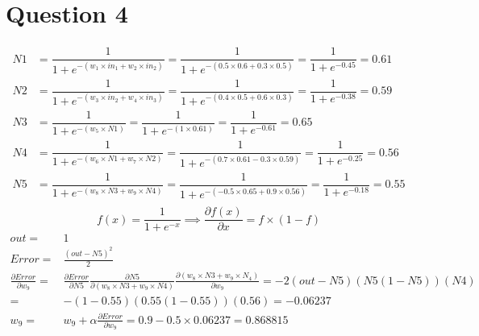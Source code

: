 \documentclass[letter, 10pt]{article}
\begin{document}
\section*{Question 4}
\begin{align*}
    N1 &= \dfrac{1}{1 + e^{-(w_1\times in_1 + w_2\times in_2)}} = \dfrac{1}{1 + e^{-(0.5\times 0.6 + 0.3\times 0.5)}} = \dfrac{1}{1 + e^{-0.45}} = 0.61\\
    N2 &= \dfrac{1}{1 + e^{-(w_3\times in_2 + w_4\times in_3)}} = \dfrac{1}{1 + e^{-(0.4\times 0.5 + 0.6\times 0.3)}} = \dfrac{1}{1 + e^{-0.38}} = 0.59\\
    N3 &= \dfrac{1}{1 + e^{-(w_5\times N1)}} = \dfrac{1}{1 + e^{-(1\times 0.61)}} = \dfrac{1}{1 + e^{-0.61}} = 0.65\\
    N4 &= \dfrac{1}{1 + e^{-(w_6\times N1 + w_7\times N2)}} = \dfrac{1}{1 + e^{-(0.7\times 0.61 - 0.3\times 0.59)}} = \dfrac{1}{1 + e^{-0.25}} = 0.56\\
    N5 &= \dfrac{1}{1 + e^{-(w_8\times N3 + w_9\times N4)}} = \dfrac{1}{1 + e^{-(-0.5\times 0.65 + 0.9\times 0.56)}} = \dfrac{1}{1 + e^{-0.18}} = 0.55\\
\end{align*}
\begin{equation*}
    f(x) = \frac{1}{1+e^{-x}} \implies \frac{\partial f(x)}{\partial x} = f\times(1-f)
\end{equation*}
\begin{align*}
    out =& 1\\
    Error =& \frac{(out - N5)^2}{2}\\
    \frac{\partial Error}{\partial w_9} =& \frac{\partial Error}{\partial N5}\frac{\partial N5}{\partial (w_8\times N3 + w_9\times N4)}\frac{\partial (w_8\times N3 + w_9\times N_4)}{\partial w_9} = -2(out-N5)(N5(1-N5))(N4)\\=& -(1-0.55)(0.55(1-0.55))(0.56) = -0.06237\\
    w_9 =& w_9 + \alpha \frac{\partial Error}{\partial w_9} = 0.9 - 0.5\times0.06237 = 0.868815
\end{align*}
\end{document}
